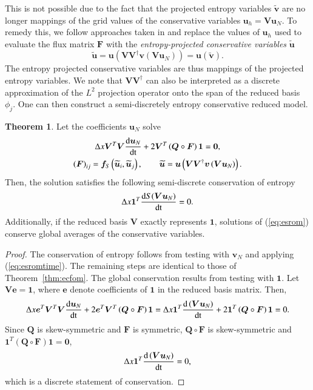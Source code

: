 \documentclass[preprint,10pt]{elsarticle}
\theoremstyle{definition}
\theoremstyle{lemma}
\theoremstyle{theorem}
\newtheorem{theorem}{Theorem}
\theoremstyle{assumption}
\renewcommand{\tilde}{\widetilde}
\newcommand{\td}[2]{\frac{{\rm d}#1}{{\rm d}{\rm #2}}}
\newcommand{\LRp}[1]{\left( #1 \right)}
\begin{document}
This is not possible due to the fact that the projected entropy variables $\tilde{\bm{v}}$ are no longer mappings of the grid values of the conservative variables $\bm{u}_h = \bm{V}\bm{u}_N$.  To remedy this, we follow approaches taken in \cite{parsani2016entropy, chan2017discretely} and replace the values of ${\bm{u}_h}$ used to evaluate the flux matrix $\bm{F}$ with the \textit{entropy-projected conservative variables} $\tilde{\bm{u}}$
\[
\tilde{\bm{u}} = \bm{u}\LRp{\bm{V}\bm{V}^{\dagger}\bm{v}\LRp{\bm{V}\bm{u}_N}} = \bm{u}\LRp{\tilde{\bm{v}}}.
\]
The entropy projected conservative variables are thus mappings of the projected entropy variables.  We note that $\bm{V}\bm{V}^{\dagger}$ can also be interpreted as a discrete approximation of the $L^2$ projection operator onto the span of the reduced basis $\phi_j$. One can then construct a semi-discretely entropy conservative reduced model.
\begin{theorem} 
Let the coefficients $\bm{u}_N$ solve
\begin{gather}
\Delta x\bm{V}^T\bm{V}\td{\bm{u}_N}{t} + 2\bm{V}^T\LRp{\bm{Q}\circ \bm{F}}\bm{1} = \bm{0}, \label{eq:esrom}\\
\LRp{\bm{F}}_{ij} = \bm{f}_S\LRp{\tilde{\bm{u}}_i,\tilde{\bm{u}}_j}, \qquad \tilde{\bm{u}} = \bm{u}\LRp{\bm{V}\bm{V}^{\dagger}\bm{v}\LRp{\bm{V}\bm{u}_N}}.\nonumber
\end{gather}
Then, the solution satisfies the following semi-discrete conservation of entropy
\[
\Delta x\bm{1}^T\td{S(\bm{V}\bm{u}_N)}{t} = 0.
\]
Additionally, if the reduced basis $\bm{V}$ exactly represents $\bm{1}$, solutions of (\ref{eq:esrom}) conserve global averages of the conservative variables.
\label{thm:esrom}
\end{theorem}
\begin{proof}
The conservation of entropy follows from testing with $\bm{v}_N$ and applying (\ref{eq:esromtime}).  The remaining steps are identical to those of Theorem~\ref{thm:ecfom}.  The global conservation results from testing with $\bm{1}$.  Let $\bm{V}\bm{e}=\bm{1}$, where $\bm{e}$ denote coefficients of $\bm{1}$ in the reduced basis matrix.  Then, 
\begin{align*}
\Delta x\bm{e}^T\bm{V}^T\bm{V}\td{\bm{u}_N}{t} + 2\bm{e}^T\bm{V}^T\LRp{\bm{Q}\circ \bm{F}}\bm{1}  = \Delta x\bm{1}^T\td{\LRp{\bm{V}\bm{u}_N}}{t} + 2\bm{1}^T\LRp{\bm{Q}\circ \bm{F}}\bm{1} = 0.
\end{align*}
Since $\bm{Q}$ is skew-symmetric and $\bm{F}$ is symmetric, $\bm{Q} \circ \bm{F}$ is skew-symmetric and $\bm{1}^T\LRp{\bm{Q}\circ \bm{F}}\bm{1} = \bm{0}$, 
\[
\Delta x\bm{1}^T\td{\LRp{\bm{V}\bm{u}_N}}{t} = 0,
\]
which is a discrete statement of conservation.
\end{proof}
\end{document}
